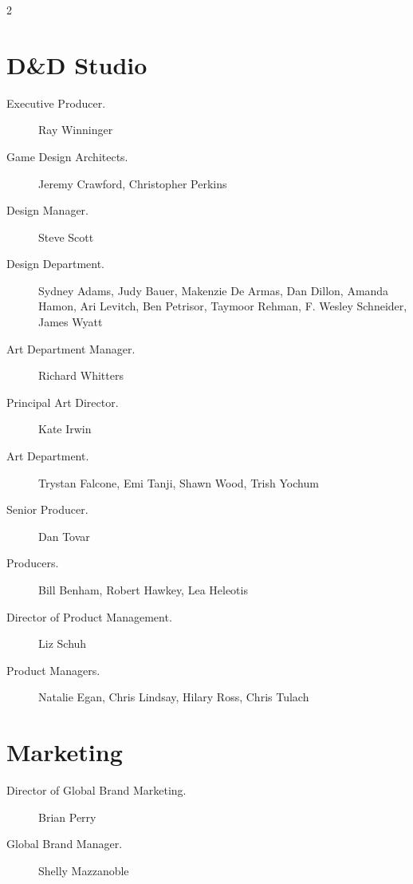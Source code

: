 \documentclass[10pt,a4paper,twoside,bg=print,twocolumn,openany,nodeprecatedcode]{dndbook}
\begin{document}
\begin{description}
\begin{multicols}{2}
\begin{description}
\end{description}

\section{D\&D Studio}

\begin{description}
\item[Executive Producer.]
Ray Winninger

\item[Game Design Architects.]
Jeremy Crawford, Christopher Perkins

\item[Design Manager.]
Steve Scott

\item[Design Department.]
Sydney Adams, Judy Bauer, Makenzie De Armas, Dan Dillon, Amanda Hamon, Ari Levitch, Ben Petrisor, Taymoor Rehman, F. Wesley Schneider, James Wyatt

\item[Art Department Manager.]
Richard Whitters

\item[Principal Art Director.]
Kate Irwin

\item[Art Department.]
Trystan Falcone, Emi Tanji, Shawn Wood, Trish Yochum

\item[Senior Producer.]
Dan Tovar

\item[Producers.]
Bill Benham, Robert Hawkey, Lea Heleotis

\item[Director of Product Management.]
Liz Schuh

\item[Product Managers.]
Natalie Egan, Chris Lindsay, Hilary Ross, Chris Tulach

\end{description}

\section{Marketing}

\begin{description}
\item[Director of Global Brand Marketing.]
Brian Perry

\item[Global Brand Manager.]
Shelly Mazzanoble


\end{description}
\end{multicols}
\end{description}
\end{document}

